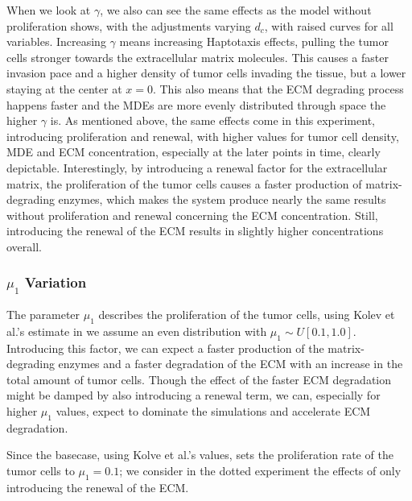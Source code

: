 When we look at $\gamma$, we also can see the same effects as the model without proliferation shows, with the adjustments varying $d_c$, with raised curves for all variables. Increasing $\gamma$ means increasing Haptotaxis effects, pulling the tumor cells stronger towards the extracellular matrix molecules. This causes a faster invasion pace and a higher density of tumor cells invading the tissue, but a lower staying at the center at $x=0$. This also means that the ECM degrading process happens faster and the MDEs are more evenly distributed through space the higher $\gamma$ is. As mentioned above, the same effects come in this experiment, introducing proliferation and renewal, with higher values for tumor cell density, MDE and ECM concentration, especially at the later points in time, clearly depictable. Interestingly, by introducing a renewal factor for the extracellular matrix, the proliferation of the tumor cells causes a faster production of matrix-degrading enzymes, which makes the system produce nearly the same results without proliferation and renewal concerning the ECM concentration. Still, introducing the renewal of the ECM results in slightly higher concentrations overall.

\subsubsection*{$\mu_1$ Variation}
The parameter $\mu_1$ describes the proliferation of the tumor cells, using Kolev et al.'s estimate in \cite{Kolev2010} we assume an even distribution with $\mu_1 \sim U[0.1, 1.0]$. Introducing this factor, we can expect a faster production of the matrix-degrading enzymes and a faster degradation of the ECM with an increase in the total amount of tumor cells. Though the effect of the faster ECM degradation might be damped by also introducing a renewal term, we can, especially for higher $\mu_1$ values, expect to dominate the simulations and accelerate ECM degradation.

Since the basecase, using Kolve et al.'s values, sets the proliferation rate of the tumor cells to $\mu_1=0.1$; we consider in the dotted experiment the effects of only introducing the renewal of the ECM.

